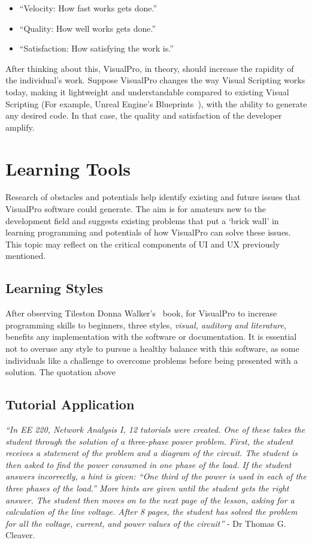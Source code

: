 \documentclass[12pt]{report} %
\begin{document}
		\begin{itemize}
		\item ``Velocity: How fast works gets done.''
		\item ``Quality: How well works gets done.''
		\item ``Satisfaction: How satisfying the work is.''
		\end{itemize}

		After thinking about this, VisualPro, in theory, should increase the rapidity of the individual’s work. Suppose VisualPro changes the way Visual Scripting works today, making it lightweight and understandable compared to existing Visual Scripting (For example, Unreal Engine's Blueprints~\cite{unreal_engine_introduction_nodate}), with the ability to generate any desired code. In that case, the quality and satisfaction of the developer amplify.

	\section{Learning Tools}
		Research of obstacles and potentials help identify existing and future issues that VisualPro software could generate. The aim is for amateurs new to the development field and suggests existing problems that put a `brick wall' in learning programming and potentials of how VisualPro can solve these issues. This topic may reflect on the critical components of UI and UX previously mentioned.

		\subsection{Learning Styles}
		After observing Tileston Donna Walker's~\cite{tileston_donna_walker_10_2011} book, for VisualPro to increase programming skills to beginners, three styles, \textit{visual, auditory and literature}, benefits any implementation with the software or documentation. It is essential not to overuse any style to pursue a healthy balance with this software, as some individuals like a challenge to overcome problems before being presented with a solution. The quotation above 

		\subsection{Tutorial Application}
		\begin{center}
			\textit{``In EE 220, Network Analysis I, 12 tutorials were created. One of these takes the student through the solution of a three-phase power problem. First, the student receives a statement of the problem and a diagram of the circuit. The student is then asked to find the power consumed in one phase of the load. If the student answers incorrectly, a hint is given: “One third of the power is used in each of the three phases of the load.” More hints are given until the student gets the right answer. The student then moves on to the next page of the lesson, asking for a calculation of the line voltage. After 8 pages, the student has solved the	problem for all the voltage, current, and power values of the circuit''} - Dr Thomas G. Cleaver.
		\end{center}
\end{document}
